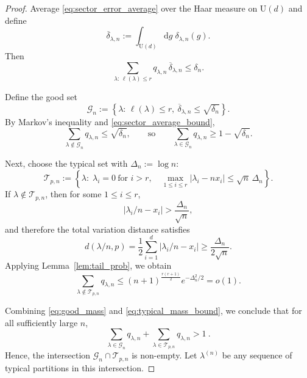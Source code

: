\documentclass[a4paper,onecolumn,11pt]{quantumarticle}
\newcommand{\dd}{\mathrm{d}}
\begin{document}
\begin{proof}
Average \eqref{eq:sector_error_average} over the Haar measure on $\mathrm U(d)$ and define
\begin{equation}
    \overline \delta_{\lambda,n}
    := 
    \int_{\mathrm U(d)} \dd g\; \delta_{\lambda,n}(g) .
\end{equation}
Then
\begin{equation}\label{eq:sector_average_bound}
    \sum_{\lambda:\,\ell(\lambda)\le r}
    q_{\lambda,n}\,\overline \delta_{\lambda,n}
    \le \delta_n .
\end{equation}

Define the good set
\begin{equation}
    \mathcal G_n
    := 
    \left\{
        \lambda:\,\ell(\lambda)\le r,\ \overline \delta_{\lambda,n}\le \sqrt{\delta_n}
    \right\}.
\end{equation}
By Markov's inequality and \eqref{eq:sector_average_bound},
\begin{equation}\label{eq:good_mass}
    \sum_{\lambda\notin \mathcal G_n} q_{\lambda,n}
    \le \sqrt{\delta_n},
    \qquad\text{so}\qquad
    \sum_{\lambda\in \mathcal G_n} q_{\lambda,n}
    \ge 1-\sqrt{\delta_n}.
\end{equation}

Next, choose the typical set with $\Delta_n:= \log n$:
\begin{equation}
    \mathcal T_{p,n}:= 
    \left\{
        \lambda:\;
        \lambda_i=0\ \text{for } i>r,\quad
        \max_{1\le i\le r} |\lambda_i-nx_i|
        \le \sqrt n\,\Delta_n
    \right\}.
\end{equation}
If $\lambda\notin \mathcal T_{p,n}$, then for some $1\le i\le r$,
\[
|\lambda_i/n-x_i|>\frac{\Delta_n}{\sqrt n},
\]
and therefore the total variation distance satisfies
\[
d(\lambda/n,p)=
\frac12\sum_{i=1}^d |\lambda_i/n-x_i|
\ge \frac{\Delta_n}{2\sqrt n}.
\]
Applying Lemma~\ref{lem:tail_prob}, we obtain
\begin{equation}\label{eq:typical_mass_bound}
    \sum_{\lambda\notin \mathcal T_{p,n}} q_{\lambda,n}
    \le
    (n+1)^{\frac{r(r+1)}{2}}
    e^{-\Delta_n^2/2}
    = o(1).
\end{equation}

Combining \eqref{eq:good_mass} and \eqref{eq:typical_mass_bound}, we conclude that for all sufficiently large $n$,
\[
\sum_{\lambda\in \mathcal G_n} q_{\lambda,n} +
\sum_{\lambda\in \mathcal T_{p,n}} q_{\lambda,n} >1\ .
\]
Hence, the intersection $\mathcal G_n\cap \mathcal T_{p,n}$ is non-empty. Let $\lambda^{(n)}$ be any sequence of typical partitions in this intersection.


\end{proof}
\end{document}
